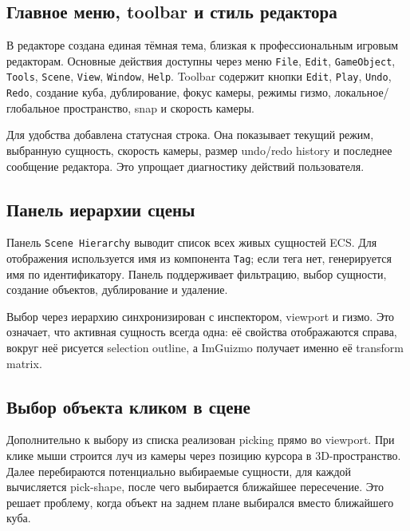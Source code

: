 \documentclass[a4paper,14pt]{extarticle}
\begin{document}
\subsection{Главное меню, toolbar и стиль редактора}
В редакторе создана единая тёмная тема, близкая к профессиональным игровым редакторам. Основные действия доступны через меню \texttt{File}, \texttt{Edit}, \texttt{GameObject}, \texttt{Tools}, \texttt{Scene}, \texttt{View}, \texttt{Window}, \texttt{Help}. Toolbar содержит кнопки \texttt{Edit}, \texttt{Play}, \texttt{Undo}, \texttt{Redo}, создание куба, дублирование, фокус камеры, режимы гизмо, локальное/глобальное пространство, snap и скорость камеры.

Для удобства добавлена статусная строка. Она показывает текущий режим, выбранную сущность, скорость камеры, размер undo/redo history и последнее сообщение редактора. Это упрощает диагностику действий пользователя.

\subsection{Панель иерархии сцены}
Панель \texttt{Scene Hierarchy} выводит список всех живых сущностей ECS. Для отображения используется имя из компонента \texttt{Tag}; если тега нет, генерируется имя по идентификатору. Панель поддерживает фильтрацию, выбор сущности, создание объектов, дублирование и удаление.

Выбор через иерархию синхронизирован с инспектором, viewport и гизмо. Это означает, что активная сущность всегда одна: её свойства отображаются справа, вокруг неё рисуется selection outline, а ImGuizmo получает именно её transform matrix.

\subsection{Выбор объекта кликом в сцене}
Дополнительно к выбору из списка реализован picking прямо во viewport. При клике мыши строится луч из камеры через позицию курсора в 3D-пространство. Далее перебираются потенциально выбираемые сущности, для каждой вычисляется pick-shape, после чего выбирается ближайшее пересечение. Это решает проблему, когда объект на заднем плане выбирался вместо ближайшего куба.
\end{document}
